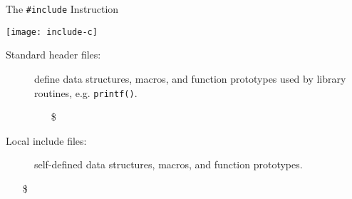 \begin{frame}{The \texttt{\#include} Instruction}
  \begin{center}
    \texttt{[image: include-c]}
  \end{center}
\begin{description}
\item[Standard header files:] define data structures, macros, and function
  prototypes used by library routines, e.g. \texttt{printf()}.
  \begin{itemize}
  \item[\$] 
  \end{itemize}
\item[Local include files:] self-defined data structures, macros, and
  function prototypes.
\end{description}
\begin{itemize}
\item[\$] 
\end{itemize}
\end{frame}

